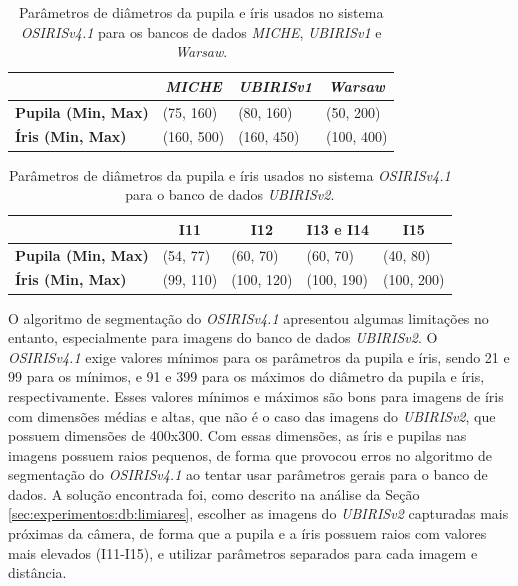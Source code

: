 \begin{table}[H]
\centering
\caption{Parâmetros de diâmetros da pupila e íris usados no sistema \textit{OSIRISv4.1} para os bancos de dados \textit{MICHE}, \textit{UBIRISv1} e \textit{Warsaw}.}
\label{tab:experimentos:diametros}
\begin{tabular}{l|l|l|l|}
\cline{2-4}
 & \multicolumn{1}{c|}{\textit{\textbf{MICHE}}} & \multicolumn{1}{c|}{\textit{\textbf{UBIRISv1}}} & \multicolumn{1}{c|}{\textit{\textbf{Warsaw}}} \\ \hline
\multicolumn{1}{|l|}{\textbf{Pupila (Min, Max)}} & (75, 160) & (80, 160) & (50, 200) \\ \hline
\multicolumn{1}{|l|}{\textbf{Íris (Min, Max)}} & (160, 500) & (160, 450) & (100, 400) \\ \hline
\end{tabular}
\end{table}

\begin{table}[H]
\centering
\caption{Parâmetros de diâmetros da pupila e íris usados no sistema \textit{OSIRISv4.1} para o banco de dados \textit{UBIRISv2}.}
\label{tab:experimentos:diametros_ubirisv2}
\begin{tabular}{l|l|l|l|l|}
\cline{2-5}
 & \multicolumn{1}{c|}{\textbf{I11}} & \multicolumn{1}{c|}{\textbf{I12}} & \multicolumn{1}{c|}{\textbf{I13 e I14}} & \multicolumn{1}{c|}{\textbf{I15}} \\ \hline
\multicolumn{1}{|l|}{\textbf{Pupila (Min, Max)}} & (54, 77) & (60, 70) & (60, 70) & (40, 80) \\ \hline
\multicolumn{1}{|l|}{\textbf{Íris (Min, Max)}} & (99, 110) & (100, 120) & (100, 190) & (100, 200) \\ \hline
\end{tabular}
\end{table}

\par O algoritmo de segmentação do \textit{OSIRISv4.1} apresentou algumas limitações no entanto, especialmente para imagens do banco de dados \textit{UBIRISv2}. O \textit{OSIRISv4.1} exige valores mínimos para os parâmetros da pupila e íris, sendo 21 e 99 para os mínimos, e 91 e 399 para os máximos do diâmetro da pupila e íris, respectivamente. Esses valores mínimos e máximos são bons para imagens de íris com dimensões médias e altas, que não é o caso das imagens do \textit{UBIRISv2}, que possuem dimensões de 400x300. Com essas dimensões, as íris e pupilas nas imagens possuem raios pequenos, de forma que provocou erros no algoritmo de segmentação do \textit{OSIRISv4.1} ao tentar usar parâmetros gerais para o banco de dados. A solução encontrada foi, como descrito na análise da Seção \ref{sec:experimentos:db:limiares}, escolher as imagens do \textit{UBIRISv2} capturadas mais próximas da câmera, de forma que a pupila e a íris possuem raios com valores mais elevados (I11-I15), e utilizar parâmetros separados para cada imagem e distância. 

